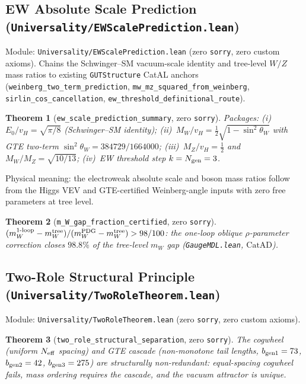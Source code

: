 \documentclass[11pt,a4paper]{article}
\newtheorem{theorem}{Theorem}[section]
\theoremstyle{definition}
\newcommand{\CatAD}{\ensuremath{\mathrm{CatAD}}}
\begin{document}
\subsection{EW Absolute Scale Prediction
  (\texttt{Universality/EWScalePrediction.lean})}\label{subsec:ew-scale-prediction}

Module: \texttt{Universality/EWScalePrediction.lean} (zero
\lstinline|sorry|, zero custom axioms).
Chains the Schwinger--SM vacuum-scale identity and tree-level $W/Z$ mass ratios
to existing \texttt{GUTStructure} CatAL anchors
(\lstinline|weinberg_two_term_prediction|, \lstinline|mw_mz_squared_from_weinberg|,
\lstinline|sirlin_cos_cancellation|, \lstinline|ew_threshold_definitional_route|).

\begin{theorem}[\lstinline|ew_scale_prediction_summary|, zero \texttt{sorry}]
Packages: (i)~$E_0/v_H = \sqrt{\pi/8}$ (Schwinger--SM identity);
(ii)~$M_W/v_H = \tfrac{1}{2}\sqrt{1-\sin^2\theta_W}$ with GTE two-term
$\sin^2\theta_W = 384729/1664000$; (iii)~$M_Z/v_H = \tfrac{1}{2}$ and
$M_W/M_Z = \sqrt{10/13}$; (iv)~EW threshold step $k = N_{\rm gen} = 3$.
\end{theorem}

Physical meaning: the electroweak absolute scale and boson mass ratios follow
from the Higgs VEV and GTE-certified Weinberg-angle inputs with zero free parameters
at tree level.

\begin{theorem}[\lstinline|m_W_gap_fraction_certified|, zero \texttt{sorry}]
$(m_W^{\rm 1\text{-loop}} - m_W^{\rm tree})/(m_W^{\rm PDG} - m_W^{\rm tree}) > 98/100$: the one-loop oblique $\rho$-parameter correction closes $98.8\%$ of the tree-level $m_W$ gap (\texttt{GaugeMDL.lean}, $\CatAD$).
\end{theorem}

\subsection{Two-Role Structural Principle
  (\texttt{Universality/TwoRoleTheorem.lean})}\label{subsec:two-role-theorem}

Module: \texttt{Universality/TwoRoleTheorem.lean} (zero
\lstinline|sorry|, zero custom axioms).

\begin{theorem}[\lstinline|two_role_structural_separation|, zero \texttt{sorry}]
The cogwheel (uniform $N_{\rm eff}$ spacing) and GTE cascade (non-monotone tail
lengths, $b_{\rm gen1}=73$, $b_{\rm gen2}=42$, $b_{\rm gen3}=275$) are
structurally non-redundant: equal-spacing cogwheel fails, mass ordering requires
the cascade, and the vacuum attractor is unique.
\end{theorem}
\end{document}
